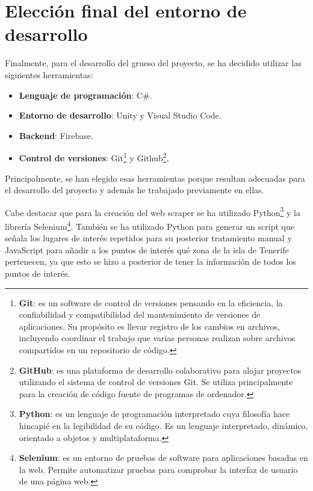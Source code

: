 \section{Elección final del entorno de desarrollo}
Finalmente, para el desarrollo del grueso del proyecto, se ha decidido utilizar las siguientes herramientas:
\begin{itemize}
\item \textbf{Lenguaje de programación}: C\#.
\item \textbf{Entorno de desarrollo}: Unity y Visual Studio Code.
\item \textbf{Backend}: Firebase.
\item \textbf{Control de versiones}: Git\footnote{\textbf{Git}: es un software de control de versiones pensando en la eficiencia, la confiabilidad y compatibilidad del mantenimiento de versiones de aplicaciones. Su propósito es llevar registro de los cambios en archivos, incluyendo coordinar el trabajo que varias personas realizan sobre archivos compartidos en un repositorio de código.} y Github\footnote{\textbf{GitHub}: es una plataforma de desarrollo colaborativo para alojar proyectos utilizando el sistema de control de versiones Git. Se utiliza principalmente para la creación de código fuente de programas de ordenador.}.
\end{itemize}
Principalmente, se han elegido esas herramientas porque resultan adecuadas para el desarrollo del proyecto y además he trabajado previamente en ellas.

Cabe destacar que para la creación del web scraper se ha utilizado Python\footnote{\textbf{Python}: es un lenguaje de programación interpretado cuya filosofía hace hincapié en la legibilidad de su código. Es un lenguaje interpretado, dinámico, orientado a objetos y multiplataforma.} y la librería Selenium\footnote{\textbf{Selenium}: es un entorno de pruebas de software para aplicaciones basadas en la web. Permite automatizar pruebas para comprobar la interfaz de usuario de una página web.}. También se ha utilizado Python para generar un script que señala los lugares de interés repetidos para su posterior tratamiento manual y JavaScript para añadir a los puntos de interés qué zona de la isla de Tenerife pertenecen, ya que esto se hizo a posterior de tener la información de todos los puntos de interés.


